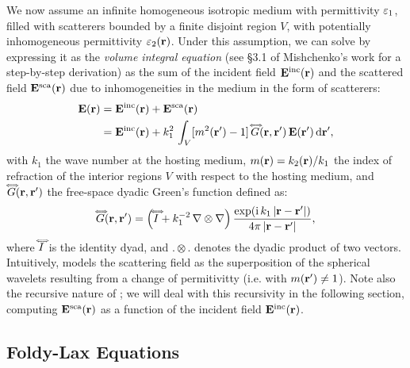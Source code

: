 We now assume an infinite homogeneous isotropic medium with permittivity $\varepsilon_1$, filled with scatterers bounded by a finite disjoint region $V$, with potentially inhomogeneous permittivity $\varepsilon_2(\mathbf{r})$. Under this assumption, we can solve  by expressing it as the \emph{volume integral equation} (see \S 3.1 of Mishchenko's work \cite{mishchenko2006multiple} for a step-by-step derivation) as the sum of the incident field $\mathbf{E}^\text{inc}(\mathbf{r})$ and the scattered field $\mathbf{E}^\text{sca}(\mathbf{r})$ due to inhomogeneities in the medium in the form of scatterers:
\begin{align}
    \mathbf{E}(\mathbf{r}) & = \mathbf{E}^\text{inc}(\mathbf{r}) + \mathbf{E}^\text{sca}(\mathbf{r}) \\
    & =\mathbf{E}^\text{inc}(\mathbf{r}) + k_1^2\,\int_V [m^2(\mathbf{r}')-1] \,\accentset{\Longleftrightarrow}{G}(\mathbf{r},\mathbf{r}') \,\mathbf{E}(\mathbf{r}') \,\text{d}\mathbf{r}',
    \label{eq:vri}
\end{align}
with $k_1$ the wave number at the hosting medium, $m(\mathbf{r}) = k_2(\mathbf{r})/k_1$ the index of refraction of the interior regions $V$ with respect to the hosting medium, and $\accentset{\Longleftrightarrow}{G}(\mathbf{r},\mathbf{r}')$ the free-space dyadic Green's function defined as:
\begin{equation}
    \accentset{\Longleftrightarrow}{G}(\mathbf{r},\mathbf{r}') = \left(\accentset{\Longleftrightarrow}{I} + k_1^{-2}\,\nabla\otimes\nabla\right) \frac{\exp(\text{i}\,k_1 \,|\mathbf{r}-\mathbf{r}'|)}{4\pi\,|\mathbf{r}-\mathbf{r}'|},
    \label{eq:greenfunc}
\end{equation}
where $\accentset{\Longleftrightarrow}{I}$ is the identity dyad, and $. \otimes .$ denotes the dyadic product of two vectors. Intuitively,  models the scattering field as the superposition of the spherical wavelets resulting from a change of permitivitty (i.e. with $m(\mathbf{r}')\neq1$). Note also the recursive nature of ; we will deal with this recursivity in the following section, computing $\mathbf{E}^\text{sca}(\mathbf{r})$ as a function of the incident field $\mathbf{E}^\text{inc}(\mathbf{r})$. 

\subsection{Foldy-Lax Equations}
\label{ssec:foldy-lax}

